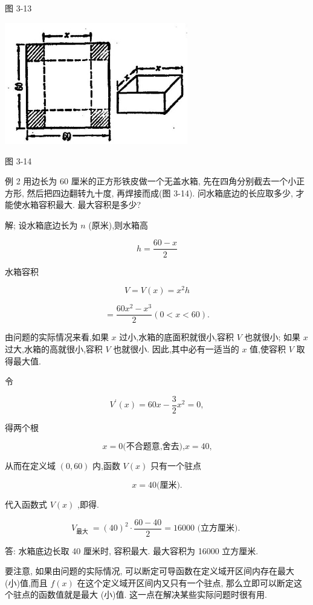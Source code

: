 \documentclass[lang=cn,newtx,12pt,scheme=chinese]{elegantbook}
\begin{document}
图 3-13

\begin{center}
\includegraphics[max width=0.6\textwidth]{images/01912c18-5c3f-733d-b775-749ba9897a9d_148_813570.jpg}
\end{center}

图 3-14

例 2 用边长为 60 厘米的正方形铁皮做一个无盖水箱, 先在四角分别截去一个小正方形, 然后把四边翻转九十度, 再焊接而成(图 3-14). 问水箱底边的长应取多少, 才能使水箱容积最大. 最大容积是多少?

解; 设水箱底边长为 \(n\) (原米),则水箱高

\[
h = \frac{{60} - x}{2}
\]

水箱容积

\[
V = V\left( x\right) = {x}^{2}h
\]

\[
= \frac{{60}{x}^{2} - {x}^{3}}{2}\left( {0 < x < {60}}\right) \text{.}
\]

由问题的实际情况来看,如果 \(x\) 过小,水箱的底面积就很小,容积 \(V\) 也就很小; 如果 \(x\) 过大,水箱的高就很小,容积 \(V\) 也就很小. 因此,其中必有一适当的 \(x\) 值,使容积 \(V\) 取得最大值.

令

\[
{V}^{\prime }\left( x\right) = {60x} - \frac{3}{2}{x}^{2} = 0,
\]

得两个根

\[
x = 0\text{(不合题意,舍去),}x = {40}\text{,}
\]

从而在定义域 \(\left( {0,{60}}\right)\) 内,函数 \(V\left( x\right)\) 只有一个驻点

\[
x = {40}\text{(厘米).}
\]

代入函数式 \(V\left( x\right)\) ,即得.

\[
{V}_{\text{最大 }} = {\left( {40}\right) }^{2} \cdot \frac{{60} - {40}}{2} = {16000}\text{ (立方厘米). }
\]

答: 水箱底边长取 40 厘米时, 容积最大. 最大容积为 16000 立方厘米.

要注意, 如果由问题的实际情况, 可以断定可导函数在定义域开区间内存在最大 (小)值,而且 \(f\left( x\right)\) 在这个定义域开区间内又只有一个驻点, 那么立即可以断定这个驻点的函数值就是最大 (小)值. 这一点在解决某些实际问题时很有用.
\end{document}
